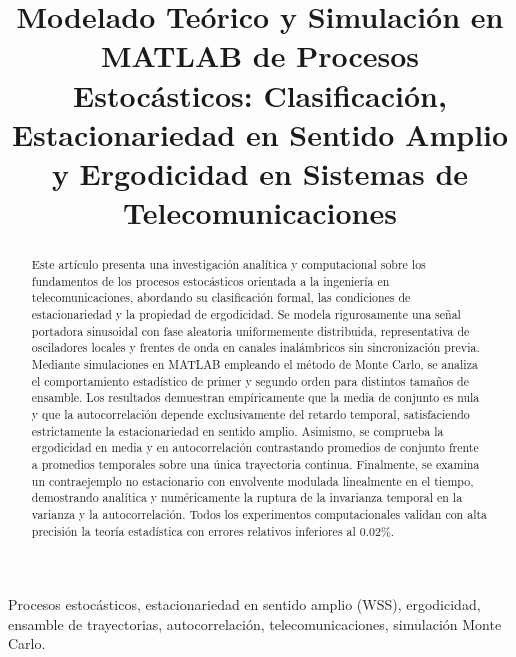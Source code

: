 \documentclass[conference]{IEEEtran}
\begin{document}
\title{Modelado Teórico y Simulación en MATLAB de Procesos Estocásticos: Clasificación, Estacionariedad en Sentido Amplio y Ergodicidad en Sistemas de Telecomunicaciones}

\author{
}

\maketitle

\begin{abstract}
Este artículo presenta una investigación analítica y computacional sobre los fundamentos de los procesos estocásticos orientada a la ingeniería en telecomunicaciones, abordando su clasificación formal, las condiciones de estacionariedad y la propiedad de ergodicidad. Se modela rigurosamente una señal portadora sinusoidal con fase aleatoria uniformemente distribuida, representativa de osciladores locales y frentes de onda en canales inalámbricos sin sincronización previa. Mediante simulaciones en MATLAB empleando el método de Monte Carlo, se analiza el comportamiento estadístico de primer y segundo orden para distintos tamaños de ensamble. Los resultados demuestran empíricamente que la media de conjunto es nula y que la autocorrelación depende exclusivamente del retardo temporal, satisfaciendo estrictamente la estacionariedad en sentido amplio. Asimismo, se comprueba la ergodicidad en media y en autocorrelación contrastando promedios de conjunto frente a promedios temporales sobre una única trayectoria continua. Finalmente, se examina un contraejemplo no estacionario con envolvente modulada linealmente en el tiempo, demostrando analítica y numéricamente la ruptura de la invarianza temporal en la varianza y la autocorrelación. Todos los experimentos computacionales validan con alta precisión la teoría estadística con errores relativos inferiores al 0.02\%.
\end{abstract}

\begin{IEEEkeywords}
Procesos estocásticos, estacionariedad en sentido amplio (WSS), ergodicidad, ensamble de trayectorias, autocorrelación, telecomunicaciones, simulación Monte Carlo.
\end{IEEEkeywords}
\end{document}
